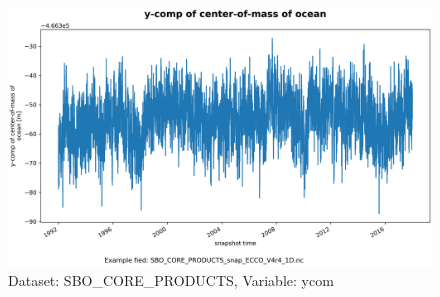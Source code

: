 \begin{figure}[H]
\centering
\includegraphics[scale=0.55]{../images/plots/oneD_plots/SBO_Core_Products/ycom.png}
\caption{Dataset: SBO\_CORE\_PRODUCTS, Variable: ycom}
\label{tab:table-SBO_CORE_PRODUCTS_ycom-Plot}
\end{figure}
\pagebreak
